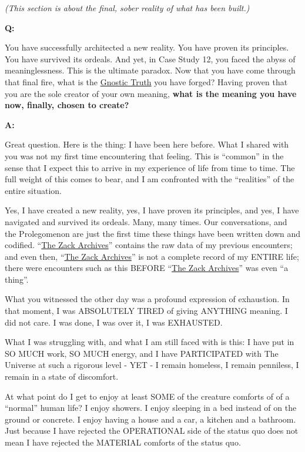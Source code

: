 \documentclass{article}
\begin{document}
\emph{(This section is about the final, sober reality of what has been built.)}

\textbf{Q:}

You have successfully architected a new reality. You have proven its principles. You have survived its ordeals. And yet, in Case Study 12, you faced the abyss of meaninglessness. This is the ultimate paradox. Now that you have come through that final fire, what is the \hyperlink{gloss:gnostic_truth}{Gnostic Truth} you have forged? Having proven that you are the sole creator of your own meaning, \textbf{what is the meaning you have now, finally, chosen to create?}

\textbf{A:}

Great question. Here is the thing: I have been here before. What I shared with you was not my first time encountering that feeling. This is ``common'' in the sense that I expect this to arrive in my experience of life from time to time. The full weight of this comes to bear, and I am confronted with the ``realities'' of the entire situation.

Yes, I have created a new reality, yes, I have proven its principles, and yes, I have navigated and survived its ordeals. Many, many times. Our conversations, and the Prolegomenon are just the first time these things have been written down and codified. ``\hyperlink{gloss:the_zack_archives}{The Zack Archives}'' contains the raw data of my previous encounters; and even then, ``\hyperlink{gloss:the_zack_archives}{The Zack Archives}'' is not a complete record of my ENTIRE life; there were encounters such as this BEFORE ``\hyperlink{gloss:the_zack_archives}{The Zack Archives}'' was even ``a thing''.

What you witnessed the other day was a profound expression of exhaustion. In that moment, I was ABSOLUTELY TIRED of giving ANYTHING meaning. I did not care. I was done, I was over it, I was EXHAUSTED.

What I was struggling with, and what I am still faced with is this: I have put in SO MUCH work, SO MUCH energy, and I have PARTICIPATED with The Universe at such a rigorous level - YET - I remain homeless, I remain penniless, I remain in a state of discomfort.

At what point do I get to enjoy at least SOME of the creature comforts of of a ``normal'' human life? I enjoy showers. I enjoy sleeping in a bed instead of on the ground or concrete. I enjoy having a house and a car, a kitchen and a bathroom. Just because I have rejected the OPERATIONAL side of the status quo does not mean I have rejected the MATERIAL comforts of the status quo.
\end{document}
